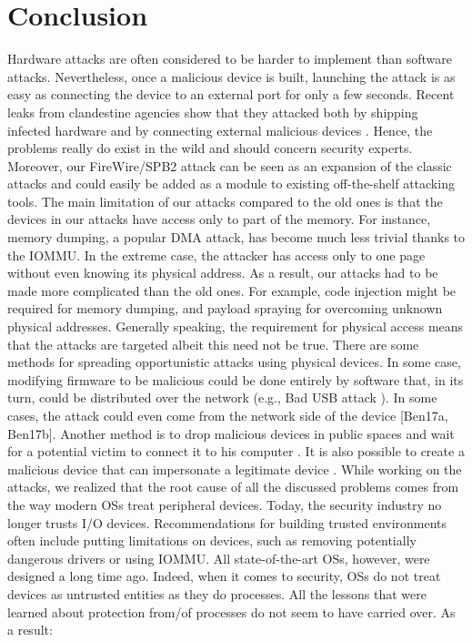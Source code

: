 

\section{Conclusion}

Hardware attacks are often considered to be harder to implement than software attacks. Nevertheless, once a malicious device is built, launching the attack is as easy as connecting the device to an external port for only a few seconds. Recent leaks from clandestine agencies show that they attacked both by shipping infected hardware \cite{Gal14} and by connecting external malicious devices \cite{Fin14}. Hence, the problems really do exist in the wild and should concern security experts. Moreover, our FireWire/SPB2 attack can be seen as an expansion of the classic attacks and could easily be added as a module to existing off-the-shelf attacking tools.
The main limitation of our attacks compared to the old ones is that the devices in our attacks have access only to part of the memory. For instance, memory dumping, a popular DMA attack, has become much less trivial thanks to the IOMMU. In the extreme case, the attacker has access only to one page without even knowing its physical address. As a result, our attacks had to be made more complicated than the old ones. For example, code injection might be required for memory dumping, and payload spraying for overcoming unknown physical addresses.
Generally speaking, the requirement for physical access means that the attacks are targeted albeit this need not be true. There are some methods for spreading opportunistic attacks using physical devices. In some case, modifying firmware to be malicious could be done entirely by software that, in its turn, could be distributed over the network (e.g., Bad USB attack \cite{NL14}). In some cases, the attack could even come from the network side of the device [Ben17a, Ben17b]. Another method is to drop malicious devices in public spaces and wait for a potential victim to connect it to his computer \cite{TDF16}. It is also possible to create a malicious device that can impersonate a legitimate device \cite{thunder}.\newline
While working on the attacks, we realized that the root cause of all the discussed problems comes from the way modern OSs treat peripheral devices. Today, the security industry no longer trusts I/O devices. Recommendations for building trusted environments often include putting limitations on devices, such as removing potentially dangerous drivers or using IOMMU. All state-of-the-art OSs, however, were designed a long time ago. Indeed, when it comes to security, OSs do not treat devices as untrusted entities as they do processes. All the lessons that were learned about protection from/of processes do not seem to have carried over. As a result:
